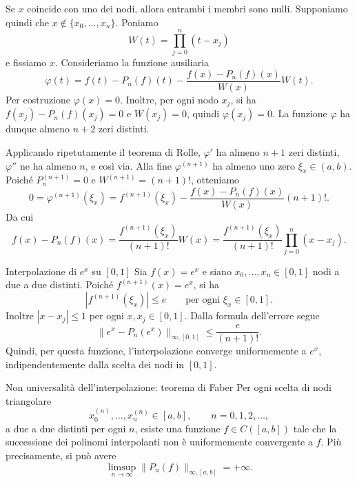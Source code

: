 \documentclass[a4paper]{article}
\begin{document}
\begin{snippetproof}{}
    Se \(x\) coincide con uno dei nodi, allora entrambi i membri sono nulli. Supponiamo quindi che \(x\notin\{x_0,\ldots,x_n\}\). Poniamo
    \[
        W(t)=\prod_{j=0}^n (t-x_j)
    \]
    e fissiamo \(x\). Consideriamo la funzione ausiliaria
    \[
        \varphi(t)
        =
        f(t)-P_n(f)(t)-
        \frac{f(x)-P_n(f)(x)}{W(x)}W(t).
    \]
    Per costruzione \(\varphi(x)=0\). Inoltre, per ogni nodo \(x_j\), si ha \(f(x_j)-P_n(f)(x_j)=0\) e \(W(x_j)=0\), quindi \(\varphi(x_j)=0\). La funzione \(\varphi\) ha dunque almeno \(n+2\) zeri distinti.

    Applicando ripetutamente il teorema di Rolle, \(\varphi'\) ha almeno \(n+1\) zeri distinti, \(\varphi''\) ne ha almeno \(n\), e così via. Alla fine \(\varphi^{(n+1)}\) ha almeno uno zero \(\xi_x\in(a,b)\). Poiché \(P_n^{(n+1)}=0\) e \(W^{(n+1)}=(n+1)!\), otteniamo
    \[
        0=
        \varphi^{(n+1)}(\xi_x)
        =
        f^{(n+1)}(\xi_x)
        -
        \frac{f(x)-P_n(f)(x)}{W(x)}(n+1)!.
    \]
    Da cui
    \[
        f(x)-P_n(f)(x)
        =
        \frac{f^{(n+1)}(\xi_x)}{(n+1)!}W(x)
        =
        \frac{f^{(n+1)}(\xi_x)}{(n+1)!}
        \prod_{j=0}^n (x-x_j).
    \]
\end{snippetproof}

\begin{snippetexample}{Interpolazione di \(e^x\) su \([0,1]\)}
    Sia \(f(x)=e^x\) e siano \(x_0,
    \ldots,x_n\in[0,1]\) nodi a due a due distinti. Poiché \(f^{(n+1)}(x)=e^x\), si ha
    \[
        \left|f^{(n+1)}(\xi_x)\right|\leq e
        \qquad \text{per ogni } \xi_x\in[0,1].
    \]
    Inoltre \(|x-x_j|\leq 1\) per ogni \(x,x_j\in[0,1]\). Dalla formula dell'errore segue
    \[
        \|e^x-P_n(e^x)\|_{\infty,[0,1]}
        \leq
        \frac{e}{(n+1)!}.
    \]
    Quindi, per questa funzione, l'interpolazione converge uniformemente a \(e^x\), indipendentemente dalla scelta dei nodi in \([0,1]\).
\end{snippetexample}

\begin{snippettheorem}{Non universalità dell'interpolazione: teorema di Faber}
    Per ogni scelta di nodi triangolare
    \[
        x_0^{(n)},\ldots,x_n^{(n)}\in[a,b],
        \qquad n=0,1,2,\ldots,
    \]
    a due a due distinti per ogni \(n\), esiste una funzione \(f\in C([a,b])\) tale che la successione dei polinomi interpolanti non è uniformemente convergente a \(f\). Più precisamente, si può avere
    \[
        \limsup_{n\to\infty}\|P_n(f)\|_{\infty,[a,b]}=+
        \infty.
    \]
\end{snippettheorem}
\end{document}
